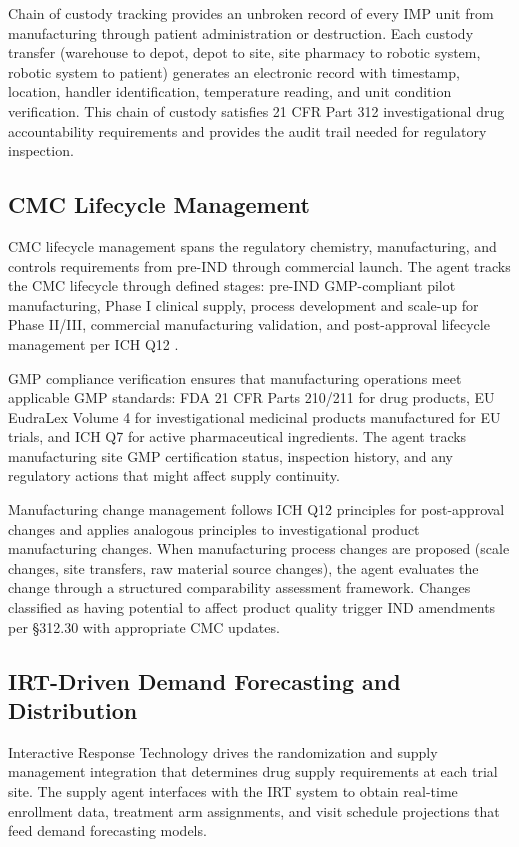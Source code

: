 Chain of custody tracking provides an unbroken record of every IMP unit from manufacturing
through patient administration or destruction. Each custody transfer (warehouse to depot,
depot to site, site pharmacy to robotic system, robotic system to patient) generates an
electronic record with timestamp, location, handler identification, temperature reading,
and unit condition verification. This chain of custody satisfies 21 CFR Part 312
investigational drug accountability requirements and provides the audit trail needed for
regulatory inspection.

\subsection{CMC Lifecycle Management}

CMC lifecycle management spans the regulatory chemistry, manufacturing, and controls
requirements from pre-IND through commercial launch. The agent tracks the CMC lifecycle
through defined stages: pre-IND GMP-compliant pilot manufacturing, Phase I clinical supply,
process development and scale-up for Phase II/III, commercial manufacturing validation, and
post-approval lifecycle management per ICH Q12 \cite{ich-q12}.

GMP compliance verification ensures that manufacturing operations meet applicable GMP
standards: FDA 21 CFR Parts 210/211 for drug products, EU EudraLex Volume 4 for
investigational medicinal products manufactured for EU trials, and ICH Q7 for active
pharmaceutical ingredients. The agent tracks manufacturing site GMP certification status,
inspection history, and any regulatory actions that might affect supply continuity.

Manufacturing change management follows ICH Q12 principles for post-approval changes and
applies analogous principles to investigational product manufacturing changes. When
manufacturing process changes are proposed (scale changes, site transfers, raw material
source changes), the agent evaluates the change through a structured comparability
assessment framework. Changes classified as having potential to affect product quality
trigger IND amendments per \S312.30 with appropriate CMC updates.

\subsection{IRT-Driven Demand Forecasting and Distribution}

Interactive Response Technology drives the randomization and supply management integration
that determines drug supply requirements at each trial site. The supply agent interfaces
with the IRT system to obtain real-time enrollment data, treatment arm assignments, and
visit schedule projections that feed demand forecasting models.

